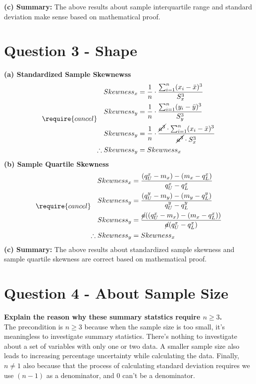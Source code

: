 \documentclass[
]{book}
\begin{document}
\textbf{(c) Summary: } The above results about sample interquartile range and standard deviation make sense based on mathematical proof.

\section{Question 3 - Shape}\label{question-3---shape}

\textbf{(a) Standardized Sample Skewnewss}
\[\require{cancel}
\begin{aligned} 
Skewness_x &= \frac{1}{n} \cdot \frac{\sum_{i=1}^{n} (x_i - \bar{x})^3}{S_x^3} \\
Skewness_y &= \frac{1}{n} \cdot \frac{\sum_{i=1}^{n} (y_i - \bar{y})^3}{S_y^3} \\
Skewness_y &= \frac{1}{n} \cdot \frac{\cancel{a^3} \cdot \sum_{i=1}^{n} (x_i - \bar{x})^3}{\cancel{a^3} \cdot S_x^3} \\
\therefore Skewness_y &= Skewness_x
\end{aligned}\]
\textbf{(b) Sample Quartile Skewness}
\[\require{cancel}
\begin{aligned}
Skewness_x &= \frac{(q_U^x - m_x) - (m_x - q_L^x)}{q_U^x - q_L^x} \\
Skewness_y &= \frac{(q_U^y - m_y) - (m_y - q_L^y)}{q_U^y - q_L^y} \\
Skewness_y &= \frac{\cancel{a}((q_U^x - m_x) - (m_x - q_L^x))}{\cancel{a}(q_U^x - q_L^x)} \\
\therefore Skewness_y &= Skewness_x
\end{aligned}\]
\textbf{(c) Summary: } The above results about standardized sample skewness and sample quartile skewness are correct based on mathematical proof.

\section{Question 4 - About Sample Size}\label{question-4---about-sample-size}

\textbf{Explain the reason why these summary statstics require \(n \geq 3\).}\\
The precondition is \(n \geq 3\) because when the sample size is too small, it's meaningless to investigate summary statistics. There's nothing to investigate about a set of variables with only one or two data. A smaller sample size also leads to increasing percentage uncertainty while calculating the data. Finally, \(n \neq 1\) also because that the process of calculating standard deviation requires we use \((n-1)\) as a denominator, and 0 can't be a denominator.
\end{document}
